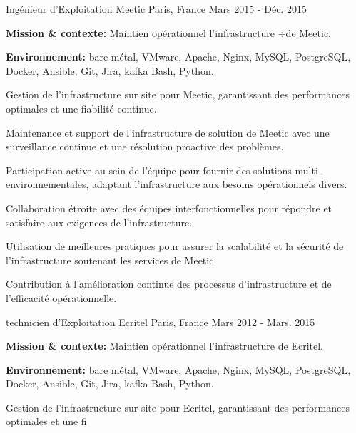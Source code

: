 \begin{cventries}
\cventry
{Ingénieur d'Exploitation} %
{Meetic} %
{Paris, France} %
{Mars 2015 - Déc. 2015} %
{
  \begin{cvitems} %
    \item {\textbf{Mission \& contexte:} Maintien opérationnel l'infrastructure ÷de Meetic.}
    \item {\textbf{Environnement:} bare métal, VMware, Apache, Nginx, MySQL, PostgreSQL, Docker, Ansible, Git, Jira, kafka Bash, Python.}
    \item {Gestion de l'infrastructure sur site pour Meetic, garantissant des performances optimales et une fiabilité continue.}
    \item {Maintenance et support de l'infrastructure de solution de Meetic avec une surveillance continue et une résolution proactive des problèmes.}
    \item {Participation active au sein de l'équipe pour fournir des solutions multi-environnementales, adaptant l'infrastructure aux besoins opérationnels divers.}
    \item {Collaboration étroite avec des équipes interfonctionnelles pour répondre et satisfaire aux exigences de l'infrastructure.}
    \item {Utilisation de meilleures pratiques pour assurer la scalabilité et la sécurité de l'infrastructure soutenant les services de Meetic.}
    \item {Contribution à l'amélioration continue des processus d'infrastructure et de l'efficacité opérationnelle.}
  \end{cvitems}
}

\cventry
{technicien d'Exploitation} %
{Ecritel} %
{Paris, France} %
{Mars 2012 - Mars. 2015} %
{
  \begin{cvitems} %
    \item {\textbf{Mission \& contexte:} Maintien opérationnel l'infrastructure de Ecritel.}
    \item {\textbf{Environnement:} bare métal, VMware, Apache, Nginx, MySQL, PostgreSQL, Docker, Ansible, Git, Jira, kafka Bash, Python.}
    \item {Gestion de l'infrastructure sur site pour Ecritel, garantissant des performances optimales et une fi}
  \end{cvitems}
}
\end{cventries}
